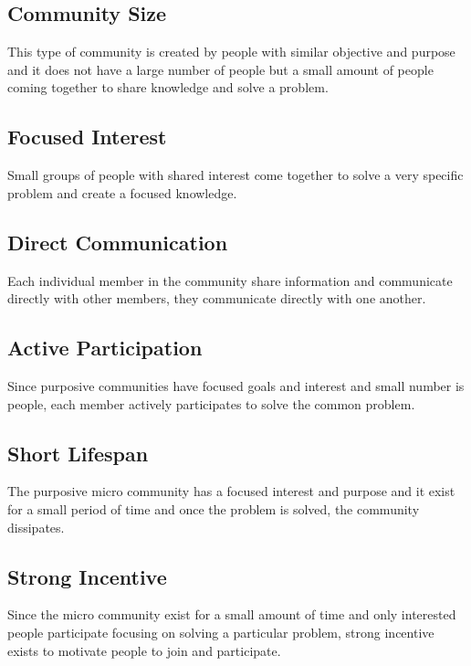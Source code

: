 \subsection{Community Size}

This type of community is created by people with similar objective and purpose and it does not have a large number of people but a small amount of people coming together to share knowledge and solve a problem.


\subsection{Focused Interest}

Small groups of people with shared interest come together to solve a very specific problem and create a focused knowledge.

\subsection{Direct Communication}

Each individual member in the community share information and communicate directly with other members, they communicate directly with one another.


\subsection{Active Participation}

Since purposive communities have focused goals and interest and small number is people, each member actively participates to solve the common problem.

\subsection{Short Lifespan}

The purposive micro community has a focused interest and purpose and it exist for a small period of time and once the problem is solved, the community dissipates.


\subsection{Strong Incentive}

Since the micro community exist for a small amount of time and only interested people participate focusing on solving a particular problem, strong incentive exists to motivate people to join and participate.


